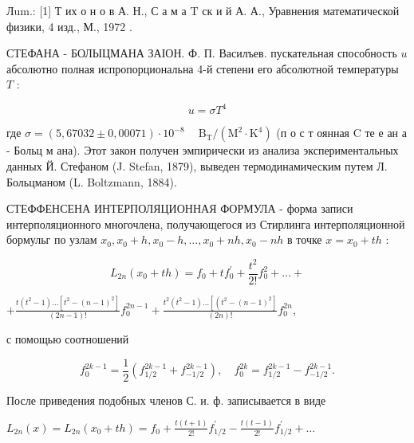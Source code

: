 \documentclass[10pt]{article}
\begin{document}
Лum.: [1] Т их о н о в А. Н., С а м а $\mathrm{T}$ ск и й А. А., Уравнения математической физики, 4 изд., М., 1972 .



СТЕФАНА - БОЛЫЦМАНА ЗАІОН. Ф. П. Василъев. пускательная способность $u$ абсолютно полная испропорциональна 4-й степени его абсолютной температуры $T$ :



\[

u=\sigma T^{4}

\]



где $\sigma=(5,67032 \pm 0,00071) \cdot 10^{-8} \quad \mathrm{~B}_{\mathrm{T}} /\left(\mathrm{M}^{2} \cdot \mathrm{K}^{4}\right)$ (п о с т оянная $\mathrm{C}$ те е ан а - Больц м ана). Этот закон получен эмпирически из анализа экспериментальных данных Й. Стефаном (J. Stefan, 1879), выведен термодинамическим путем Л. Больцманом (L. Boltzmann, 1884).



СТЕФФЕНСЕНА ИНТЕРПОЛЯЦИОННАЯ ФОРМУЛА - форма записи интерполяционного многочлена, получающегося из Стирлинга интерполяционной бормульг по узлам $x_{0}, x_{0}+h, x_{0}-h, \ldots, x_{0}+n h, x_{0}-n h$ в точке $x=x_{0}+t h$ :



\[

L_{2 n}\left(x_{0}+t h\right)=f_{0}+t f_{0}^{\prime}+\frac{t^{2}}{2 !} f_{0}^{2}+\ldots+

\]



$+\frac{t\left(t^{2}-1\right) \ldots\left[t^{2}-(n-1)^{2}\right]}{(2 n-1) !} f_{0}^{2 n-1}+\frac{t^{2}\left(t^{2}-1\right) \ldots\left[\left(t^{2}-(n-1)^{2}\right]\right.}{(2 n) !} f_{0}^{2 n}$,



с помощью соотношений



\[

f_{0}^{2 k-1}=\frac{1}{2}\left(f_{1 / 2}^{2 k-1}+f_{-1 / 2}^{2 k-1}\right), \quad f_{0}^{2 k}=f_{1 / 2}^{2 k-1}-f_{-1 / 2}^{2 k-1} .

\]



После приведения подобных членов С. и. ф. записывается в виде



$L_{2 n}(x)=L_{2 n}\left(x_{0}+t h\right)=f_{0}+\frac{t(t+1)}{2 !} f_{1 / 2}^{\prime}-\frac{t(t-1)}{2 !} f_{1 / 2}^{\prime}+\ldots$
\end{document}
